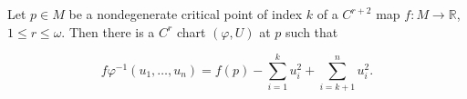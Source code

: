 Let $p \in M$ be a nondegenerate critical point of index $k$ of a $C^{r+2}$ map $f: M \to \mathbb{R}$, $1 \leqslant r \leqslant \omega$. Then there is a $C^r$ chart $(\varphi, U)$ at $p$ such that

$$f\varphi^{-1}(u_1, \ldots, u_n) = f(p) - \sum_{i=1}^{k} u_i^2 + \sum_{i=k+1}^{n} u_i^2.$$
